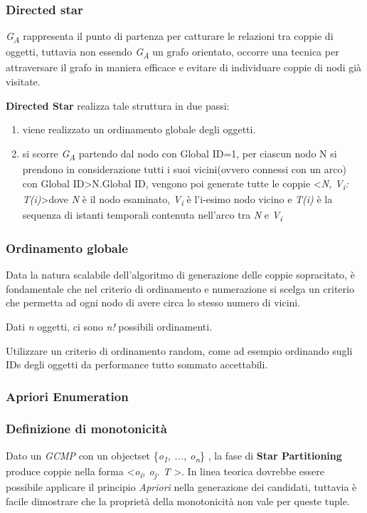 \documentclass{beamer}
\begin{document}
\begin{frame}
	\frametitle{Directed star}
	\textit{G\textsubscript{A}} rappresenta il punto di partenza per catturare le relazioni tra coppie di oggetti, tuttavia non essendo  \textit{G\textsubscript{A}} un grafo orientato, occorre una tecnica per attraversare il grafo in maniera efficace e evitare di individuare coppie di nodi già visitate.
	
	\textbf{Directed Star} realizza tale struttura in due passi:
	\begin{enumerate}
		\item viene realizzato un ordinamento globale degli oggetti.
		\item si scorre \textit{G\textsubscript{A}} partendo dal nodo con Global ID=1, per ciascun nodo N si prendono in considerazione tutti i suoi vicini(ovvero connessi con un arco) con Global ID\textgreater   N.Global ID, vengono poi generate tutte le coppie 
		\textless \textit{N, V\textsubscript{i}: T(i)}\textgreater  dove \textit{N} è il nodo esaminato,
		\textit{V\textsubscript{i}} è l'i-esimo nodo vicino e \textit{T(i)} è la sequenza di istanti temporali contenuta nell'arco tra \textit{N} e \textit{V\textsubscript{i}}
	\end{enumerate}	
\end{frame}

\begin{frame}
	\frametitle{Ordinamento globale}
	Data la natura scalabile dell'algoritmo di generazione delle coppie sopracitato, è fondamentale che nel criterio di ordinamento e numerazione si scelga un criterio che permetta ad ogni nodo di avere circa lo stesso numero di vicini.
	
	Dati \textit{n} oggetti, ci sono \textit{n!} possibili ordinamenti.
	
	Utilizzare un criterio di ordinamento random, come ad esempio ordinando sugli IDs degli oggetti da performance tutto sommato accettabili.
\end{frame}

\subsubsection{Apriori Enumeration}

\begin{frame}
	\frametitle{Definizione di monotonicità}
	Dato un \textit{GCMP} con un objectset \{\textit{o\textsubscript{1}, ..., o\textsubscript{n}}\} , la fase di \textbf{Star Partitioning} produce coppie nella forma 
	\textless \textit{o\textsubscript{i}, o\textsubscript{j}. T} \textgreater.
	In linea teorica dovrebbe essere possibile applicare il principio \textit{Apriori} nella generazione dei candidati, tuttavia è facile dimostrare che la proprietà della monotonicità non vale per queste tuple.
\end{frame}
\end{document}
